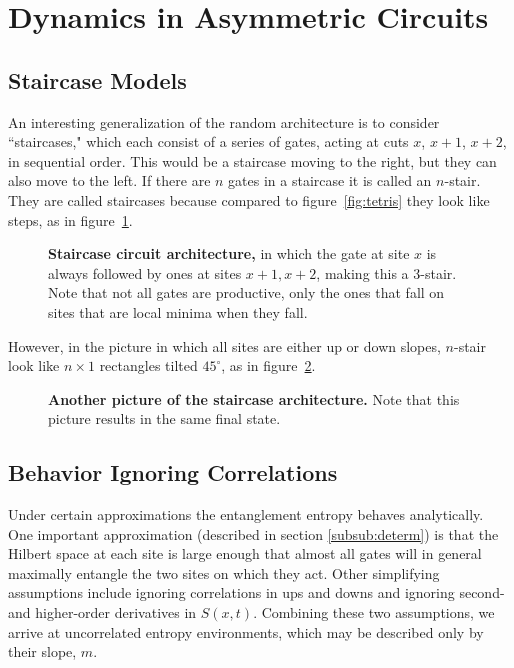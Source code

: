 \section{Dynamics in Asymmetric Circuits} \label{sec:stairs}

\subsection{Staircase Models} \label{sub:stairs}

An interesting generalization of the random architecture is to consider ``staircases," which each consist of a series of gates, acting at cuts $x$, $x+1$, $x+2$, in sequential order. This would be a staircase moving to the right, but they can also move to the left. If there are $n$ gates in a staircase it is called an $n$-stair. They are called staircases because compared to figure~\ref{fig:tetris} they look like steps, as in figure~\ref{fig:stairs}. 
\begin{figure}
	\centering
	
	\caption{\textbf{Staircase circuit architecture,} in which the gate at site $x$ is always followed by ones at sites $x+1, x+2$, making this a 3-stair. Note that not all gates are productive, only the ones that fall on sites that are local minima when they fall.}
	\label{fig:stairs}
\end{figure}
However, in the picture in which all sites are either up or down slopes, $n$-stair look like $n\times 1$ rectangles tilted $45^\circ$, as in figure~\ref{fig:diagstairs}.
\begin{figure}
	\centering
	
	\caption{\textbf{Another picture of the staircase architecture.} Note that this picture results in the same final state.}
	\label{fig:diagstairs}
\end{figure}

\subsection{Behavior Ignoring Correlations} \label{sub:anal}

Under certain approximations the entanglement entropy behaves analytically. One important approximation (described in section \ref{subsub:determ}) is that the Hilbert space at each site is large enough that almost all gates will in general maximally entangle the two sites on which they act. Other simplifying assumptions include ignoring correlations in ups and downs and ignoring second- and higher-order derivatives in $S(x,t)$. Combining these two assumptions, we arrive at uncorrelated entropy environments, which may be described only by their slope, $m$.

